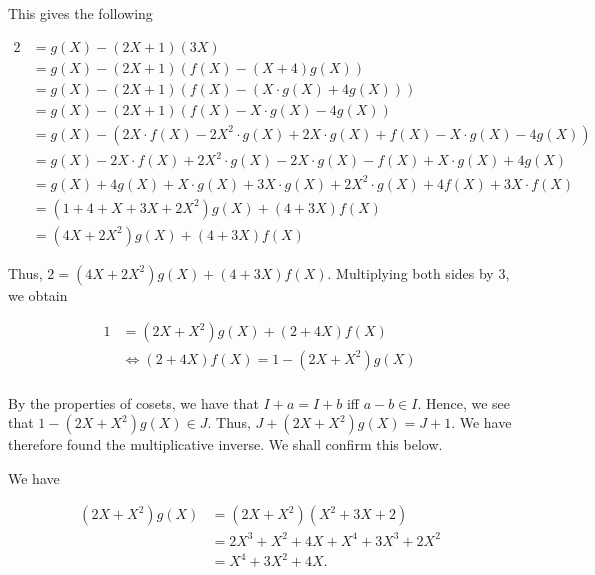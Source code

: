 \documentclass[12pt, a4paper]{article}
\begin{document}
\vspace{4mm}

This gives the following

     \begin{equation*}
        \begin{split}
            2 &= g(X)-(2X+1)(3X) \\
            &= g(X)-(2X+1)(f(X)-(X+4)g(X)) \\
            &= g(X)-(2X+1)(f(X)-(X\cdot g(X)+4g(X))) \\
            &= g(X)-(2X+1)(f(X)-X\cdot g(X)-4g(X)) \\
            &= g(X)-(2X\cdot f(X)-2X^2\cdot g(X)+2X\cdot g(X)+f(X)-X\cdot g(X) -4g(X)) \\
            &= g(X)-2X\cdot f(X)+2X^2\cdot g(X)-2X\cdot g(X)-f(X)+X\cdot g(X)+4g(X) \\
            &= g(X)+4g(X)+X\cdot g(X)+3X\cdot g(X)+2X^2\cdot g(X)+4f(X)+3X\cdot f(X)\\
            &= (1+4+X+3X+2X^2)g(X)+(4+3X)f(X) \\
            &= (4X+2X^2)g(X)+(4+3X)f(X)
        \end{split}
    \end{equation*}
    
\vspace{4mm}

Thus, $2=(4X+2X^2)g(X)+(4+3X)f(X)$. Multiplying both sides by $3$, we obtain

     \begin{equation*}
        \begin{split}
            1 &= (2X+X^2)g(X)+(2+4X)f(X) \\
            &\Leftrightarrow (2+4X)f(X)=1-(2X+X^2)g(X) \\
        \end{split}
    \end{equation*}
    
    
\vspace{4mm}

By the properties of cosets, we have that $I+a=I+b$ iff $a-b\in I$. Hence, we see that $1-(2X+X^2)g(X)\in J$. Thus, $J+(2X+X^2)g(X)=J+1$. We have therefore found the multiplicative inverse. We shall confirm this below.

\newpage

\noindent We have

    \begin{equation*}
        \begin{split}
            (2X+X^2)g(X) &= (2X+X^2)(X^2+3X+2) \\
            &= 2X^3+X^2+4X+X^4+3X^3+2X^2 \\
            &= X^4+3X^2+4X.
        \end{split}
    \end{equation*}
    
\end{document}
